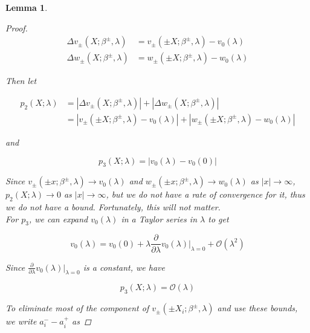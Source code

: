 \documentclass[12pt]{article}
\newtheorem{lemma}{Lemma}
\begin{document}
\begin{lemma}
\begin{proof}
\begin{align*}
\Delta v_\pm(X; \beta^\pm, \lambda) &= v_\pm(\pm X; \beta^\pm, \lambda) - v_0(\lambda) \\
\Delta w_\pm(X; \beta^\pm, \lambda) &= w_\pm(\pm X; \beta^\pm, \lambda) - w_0(\lambda)
\end{align*}

Then let

\begin{align*}
p_2(X; \lambda) &= |\Delta v_\pm(X; \beta^\pm, \lambda)| + |\Delta w_\pm(X; \beta^\pm, \lambda)|\\
&= |v_\pm(\pm X; \beta^\pm, \lambda) - v_0(\lambda)| + |w_\pm(\pm X; \beta^\pm, \lambda) - w_0(\lambda)|
\end{align*}

and

\begin{equation}\label{p3}
p_3(X; \lambda) = |v_0(\lambda) - v_0(0)| 
\end{equation}

Since $v_\pm(\pm x; \beta^\pm, \lambda) \rightarrow v_0(\lambda)$ and $w_\pm(\pm x; \beta^\pm, \lambda) \rightarrow w_0(\lambda)$ as $|x| \rightarrow \infty$, $p_2(X; \lambda) \rightarrow 0$ as $|x| \rightarrow \infty$, but we do not have a rate of convergence for it, thus we do not have a bound. Fortunately, this will not matter.\\

For $p_3$, we can expand $v_0(\lambda)$ in a Taylor series in $\lambda$ to get

\[
v_0(\lambda) = v_0(0) + \lambda \frac{\partial}{\partial \lambda}v_0(\lambda)\Big|_{\lambda = 0} + \mathcal{O}(\lambda^2)
\]

Since $\frac{\partial}{\partial \lambda}v_0(\lambda)\Big|_{\lambda = 0}$ is a constant, we have

\[
p_3(X; \lambda) = \mathcal{O}(\lambda) 
\]

To eliminate most of the component of $v_\pm(\pm X_i; \beta^\pm, \lambda)$ and use these bounds, we write $a_i^- - a_i^+$ as


\end{proof}
\end{lemma}
\end{document}

